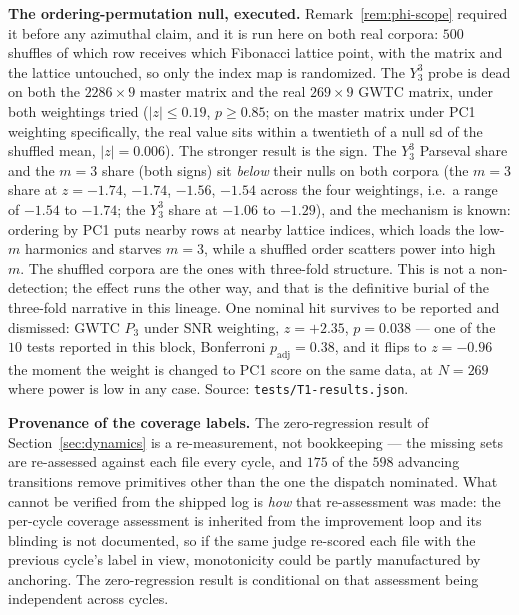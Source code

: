 \documentclass[11pt,a4paper]{article}
\theoremstyle{plain}
\theoremstyle{remark}
\theoremstyle{plain}
\begin{document}
\textbf{The ordering-permutation null, executed.} Remark~\ref{rem:phi-scope} required it before any azimuthal claim, and it is run here on both real corpora: $500$ shuffles of which row receives which Fibonacci lattice point, with the matrix and the lattice untouched, so only the index map is randomized. The $Y_3^3$ probe is dead on both the $2286\times9$ master matrix and the real $269\times9$ GWTC matrix, under both weightings tried ($|z|\le0.19$, $p\ge0.85$; on the master matrix under PC1 weighting specifically, the real value sits within a twentieth of a null sd of the shuffled mean, $|z|=0.006$). The stronger result is the sign. The $Y_3^3$ Parseval share and the $m{=}3$ share (both signs) sit \emph{below} their nulls on both corpora (the $m{=}3$ share at $z=-1.74$, $-1.74$, $-1.56$, $-1.54$ across the four weightings, i.e.\ a range of $-1.54$ to $-1.74$; the $Y_3^3$ share at $-1.06$ to $-1.29$), and the mechanism is known: ordering by PC1 puts nearby rows at nearby lattice indices, which loads the low-$m$ harmonics and starves $m{=}3$, while a shuffled order scatters power into high $m$. The shuffled corpora are the ones with three-fold structure. This is not a non-detection; the effect runs the other way, and that is the definitive burial of the three-fold narrative in this lineage. One nominal hit survives to be reported and dismissed: GWTC $P_3$ under SNR weighting, $z=+2.35$, $p=0.038$ --- one of the $10$ tests reported in this block, Bonferroni $p_\mathrm{adj}=0.38$, and it flips to $z=-0.96$ the moment the weight is changed to PC1 score on the same data, at $N=269$ where power is low in any case. Source: \texttt{tests/T1-results.json}.

\textbf{Provenance of the coverage labels.} The zero-regression result of Section~\ref{sec:dynamics} is a re-measurement, not bookkeeping --- the missing sets are re-assessed against each file every cycle, and $175$ of the $598$ advancing transitions remove primitives other than the one the dispatch nominated. What cannot be verified from the shipped log is \emph{how} that re-assessment was made: the per-cycle coverage assessment is inherited from the improvement loop and its blinding is not documented, so if the same judge re-scored each file with the previous cycle's label in view, monotonicity could be partly manufactured by anchoring. The zero-regression result is conditional on that assessment being independent across cycles.
\end{document}
